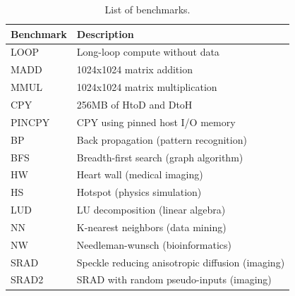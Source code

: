 \begin{table}[t]
 \caption{List of benchmarks.}
 \label{tab:benchmarks}
 \vspace{-0.5em}
 \begin{center}
  {\footnotesize
  \begin{tabular}{|l|l|}
   \hline
   \textbf{Benchmark} & \textbf{Description}\\
   \hline
   LOOP & Long-loop compute without data \\
   \hline
   MADD & 1024x1024 matrix addition\\
   \hline
   MMUL & 1024x1024 matrix multiplication\\
   \hline
   CPY & 256MB of HtoD and DtoH\\
   \hline
   PINCPY & CPY using pinned host I/O memory\\
   \hline
   BP & Back propagation (pattern recognition)\\
   \hline
   BFS & Breadth-first search (graph algorithm)\\
   \hline
   HW & Heart wall (medical imaging)\\
   \hline
   HS & Hotspot (physics simulation)\\
   \hline
   LUD & LU decomposition (linear algebra)\\
   \hline
   NN & K-nearest neighbors (data mining)\\
   \hline
   NW & Needleman-wunsch (bioinformatics)\\
   \hline
   SRAD & Speckle reducing anisotropic diffusion (imaging)\\
   \hline
   SRAD2 & SRAD with random pseudo-inputs (imaging)\\
   \hline
  \end{tabular}
  }
 \end{center}
 \vspace{-1.5em}
\end{table}

